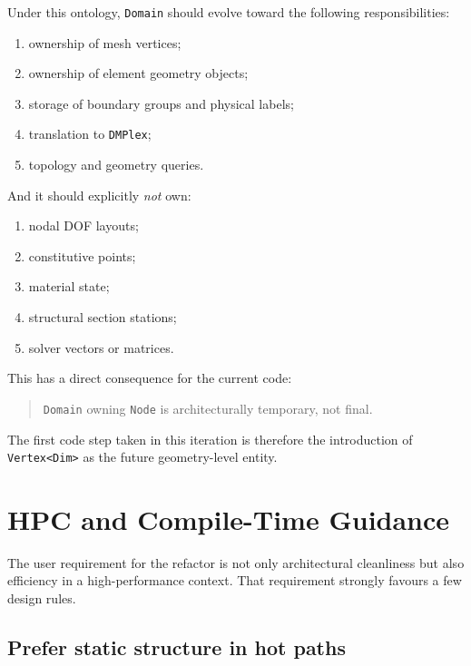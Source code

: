 Under this ontology, \texttt{Domain} should evolve toward the following
responsibilities:

\begin{enumerate}[nosep]
  \item ownership of mesh vertices;
  \item ownership of element geometry objects;
  \item storage of boundary groups and physical labels;
  \item translation to \texttt{DMPlex};
  \item topology and geometry queries.
\end{enumerate}

And it should explicitly \emph{not} own:

\begin{enumerate}[nosep]
  \item nodal DOF layouts;
  \item constitutive points;
  \item material state;
  \item structural section stations;
  \item solver vectors or matrices.
\end{enumerate}

This has a direct consequence for the current code:

\begin{quote}
\texttt{Domain} owning \texttt{Node} is architecturally temporary, not final.
\end{quote}

The first code step taken in this iteration is therefore the introduction of
\texttt{Vertex<Dim>} as the future geometry-level entity.


\section{HPC and Compile-Time Guidance}
\label{sec:domain-ontology-hpc}

The user requirement for the refactor is not only architectural cleanliness but
also efficiency in a high-performance context.  That requirement strongly
favours a few design rules.

\subsection{Prefer static structure in hot paths}

